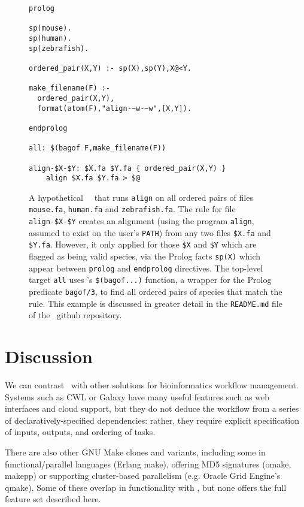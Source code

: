 \begin{figure}[H]
\begin{Verbatim}[frame=single]
prolog

sp(mouse).
sp(human).
sp(zebrafish).

ordered_pair(X,Y) :- sp(X),sp(Y),X@<Y.

make_filename(F) :-
  ordered_pair(X,Y),
  format(atom(F),"align-~w-~w",[X,Y]).

endprolog

all: $(bagof F,make_filename(F))

align-$X-$Y: $X.fa $Y.fa { ordered_pair(X,Y) }
    align $X.fa $Y.fa > $@
\end{Verbatim}
\caption{
  A hypothetical \biomake\ \Makefile\ that runs {\tt align} on all ordered pairs of files
  {\tt mouse.fa}, {\tt human.fa} and {\tt zebrafish.fa}.
The rule for file {\tt align-\$X-\$Y} creates an alignment (using the program {\tt align}, assumed to exist on the user's {\tt PATH})
from any two files {\tt \$X.fa} and {\tt \$Y.fa}.
However, it only applied for those {\tt \$X} and {\tt \$Y} which are flagged as being valid species, via the Prolog facts {\tt sp(X)}
which appear between {\tt prolog} and {\tt endprolog} directives.
The top-level target {\tt all} uses \biomake's {\tt \$(bagof...)} function, a wrapper for the Prolog predicate {\tt bagof/3},
to find all ordered pairs of species that match the rule.
This example is discussed in greater detail in the {\tt README.md} file of the \biomake\ github repository.
}
\end{figure}

\section*{Discussion}

We can contrast \biomake\ with other solutions for bioinformatics workflow management.
Systems such as CWL or Galaxy have many useful features such as web interfaces and cloud support,
but they do not deduce the workflow from a series of declaratively-specified dependencies: rather, they require explicit specification of inputs, outputs, and ordering of tasks.

There are also other GNU Make clones and variants, including some in functional/parallel languages (Erlang make),
offering MD5 signatures (omake, makepp)
or supporting cluster-based parallelism (e.g. Oracle Grid Engine's qmake).
Some of these overlap in functionality with \biomake, but none offers the full feature set described here.

